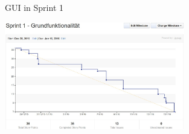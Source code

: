 \begin{description}
	\begin{figure}[H]
		\centering
		\hfill
		\caption{GUI in Sprint 1}
	\end{figure}

	\begin{figure}[H]
		\centering
		\includegraphics[width=0.7\textwidth]{burndown_sprint1.jpg}
	\end{figure}


\end{description}
